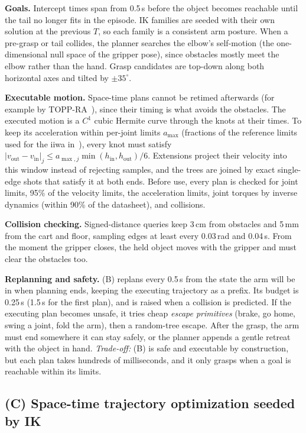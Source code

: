 \documentclass[conference]{IEEEtran}
\begin{document}
\textbf{Goals.} Intercept times span from 0.5\,s before the object becomes reachable until the tail no longer fits
in the episode. IK families are seeded with their own solution at the previous $T$, so each family is a
consistent arm posture. When a pre-grasp or tail collides, the planner searches the elbow's self-motion
(the one-dimensional null space of the gripper pose), since obstacles mostly meet the elbow rather than
the hand. Grasp candidates are top-down along both horizontal axes and tilted by $\pm35^\circ$.

\textbf{Executable motion.} Space-time plans cannot be retimed afterwards (for example by
TOPP-RA~\cite{pham2018toppra}), since their timing is what avoids the obstacles. The executed motion is a
$C^1$ cubic Hermite curve through the knots at their times. To keep its acceleration within per-joint
limits $a_{\max}$ (fractions of the reference limits used for the iiwa in~\cite{kiemel2024jerk}), every
knot must satisfy $|v_{\text{out}}-v_{\text{in}}|_j \le a_{\max,j}\min(h_{\text{in}},h_{\text{out}})/6$.
Extensions project their velocity into this window instead of rejecting samples, and the trees are joined
by exact single-edge shots that satisfy it at both ends. Before use, every plan is checked for joint
limits, 95\% of the velocity limits, the acceleration limits, joint torques by inverse dynamics (within
90\% of the datasheet), and collisions.

\textbf{Collision checking.} Signed-distance queries keep 3\,cm from obstacles and 5\,mm from the cart
and floor, sampling edges at least every 0.03\,rad and 0.04\,s. From the moment the gripper closes, the
held object moves with the gripper and must clear the obstacles too.

\textbf{Replanning and safety.} (B) replans every 0.5\,s from the state the arm will be in when planning
ends, keeping the executing trajectory as a prefix. Its budget is 0.25\,s (1.5\,s for the first plan),
and is raised when a collision is predicted. If the executing plan becomes unsafe, it tries cheap
\emph{escape primitives} (brake, go home, swing a joint, fold the arm), then a random-tree escape. After
the grasp, the arm must end somewhere it can stay safely, or the planner appends a gentle retreat with
the object in hand. \emph{Trade-off:} (B) is safe and executable by construction, but each plan takes
hundreds of milliseconds, and it only grasps when a goal is reachable within its limits.

\subsection{(C) Space-time trajectory optimization seeded by IK}
\end{document}
